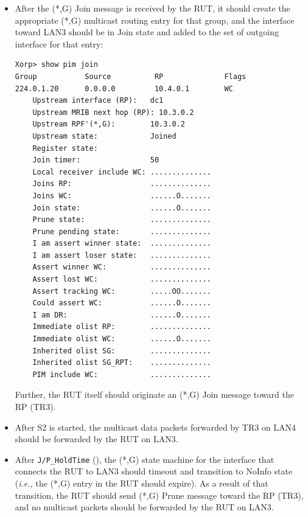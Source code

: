 \documentclass[11pt]{report}
\newcommand{\ie}{\emph{i.e.,}\xspace}
\begin{document}
\begin{itemize}

  \item After the (*,G) Join message is received by the RUT, it
  should create the appropriate (*,G) multicast routing entry for
  that group, and the interface toward LAN3 should be in Join state and
  added to the set of outgoing interface for that entry:

\begin{verbatim}
Xorp> show pim join 
Group           Source          RP              Flags
224.0.1.20      0.0.0.0         10.4.0.1        WC   
    Upstream interface (RP):   dc1
    Upstream MRIB next hop (RP): 10.3.0.2
    Upstream RPF'(*,G):        10.3.0.2
    Upstream state:            Joined 
    Register state:            
    Join timer:                50
    Local receiver include WC: ..............
    Joins RP:                  ..............
    Joins WC:                  ......O.......
    Join state:                ......O.......
    Prune state:               ..............
    Prune pending state:       ..............
    I am assert winner state:  ..............
    I am assert loser state:   ..............
    Assert winner WC:          ..............
    Assert lost WC:            ..............
    Assert tracking WC:        .....OO.......
    Could assert WC:           ......O.......
    I am DR:                   ......O.......
    Immediate olist RP:        ..............
    Immediate olist WC:        ......O.......
    Inherited olist SG:        ..............
    Inherited olist SG_RPT:    ..............
    PIM include WC:            ..............
\end{verbatim}

  Further, the RUT itself should originate an (*,G) Join message
  toward the RP (TR3).

  \item After S2 is started, the multicast data packets forwarded by TR3
  on LAN4 should be forwarded by the RUT on LAN3.

  \item After \verb=J/P_HoldTime= ({\PimsmJPHoldTime}),
  the (*,G) state machine for the interface that connects the RUT to
  LAN3 should timeout and transition to NoInfo state
  (\ie the (*,G) entry in the RUT should expire).
  As a result of that transition, the RUT should send (*,G) Prune
  message toward the RP (TR3), and no multicast packets should be
  forwarded by the RUT on LAN3.

\end{itemize}
\end{document}
